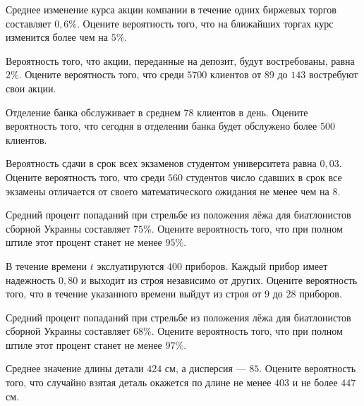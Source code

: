 \vfill

\newpage\setcounter{zad}{0}

\z Среднее изменение курса акции компании в течение одних биржевых торгов составляет $ 0{,}6 \% $. Оцените вероятность того, что на ближайших торгах курс изменится более чем на $ 5 \% $.


\vfill

\z Вероятность того, что акции, переданные на депозит, будут востребованы, равна $ 2 \% $. Оцените вероятность того, что среди $ 5700 $ клиентов от $ 89 $ до $ 143 $ востребуют свои акции.
 

\vfill

\newpage\setcounter{zad}{0}

\z Отделение банка обслуживает в среднем $ 78 $ клиентов в день. Оцените вероятность того, что сегодня в отделении банка будет обслужено более $ 500 $ клиентов.


\vfill

\z Вероятность сдачи в срок всех экзаменов студентом университета равна $ 0{,}03 $. Оцените вероятность того, что среди $ 560 $ студентов число сдавших в срок все экзамены отличается от своего математического ожидания не менее чем на $ 8 $. 
 

\vfill

\newpage\setcounter{zad}{0}

\z Средний процент попаданий при стрельбе из положения лёжа для биатлонистов сборной Украины составляет $ 75 \% $. Оцените вероятность того, что при полном штиле этот процент станет не менее $ 95 \% $.


\vfill

\z В течение времени $t$ экслуатируются $ 400 $ приборов. Каждый прибор имеет надежность $ 0{,}80 $ и выходит из строя независимо от других. Оцените вероятность того, что в течение указанного времени выйдут из строя от $ 9 $ до $ 28 $ приборов.
 

\vfill

\newpage\setcounter{zad}{0}

\z Средний процент попаданий при стрельбе из положения лёжа для биатлонистов сборной Украины составляет $ 68 \% $. Оцените вероятность того, что при полном штиле этот процент станет не менее $ 97 \% $.


\vfill

\z Среднее значение длины детали $ 424 $ см, а дисперсия --- $ 85 $. Оцените вероятность того, что случайно взятая деталь окажется по длине не менее $ 403 $ и не более $ 447 $ см.
 

